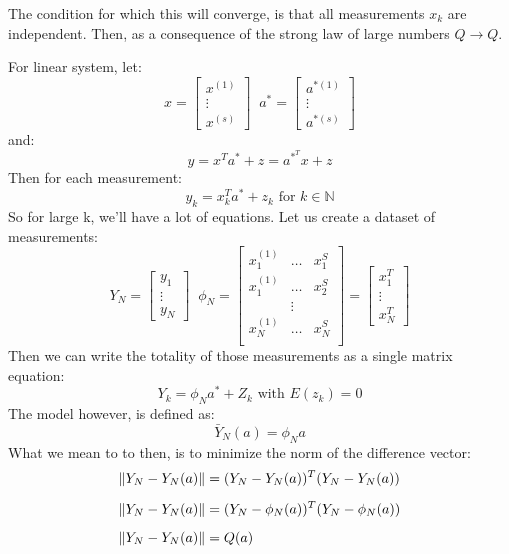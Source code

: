 {{ The condition for which this will converge, is that all measurements $x_k$ are independent. Then, as a consequence of the strong law of large numbers  $\hat{Q} \rightarrow  Q$.


}
For linear system, let:
\begin{equation}
    x = \begin{bmatrix}
        x^{(1)}  \\
        \vdots\\
        x^{(s)}
    \end{bmatrix}
    \;\;
a^{*} = \begin{bmatrix}
        a^{*(1)}  \\
        \vdots\\
        a^{*(s)}
    \end{bmatrix}
\end{equation}
and:
\begin{equation}
    y = x^{T}a^{*} + z = a^{*^{T}}x + z
\end{equation}
Then for each measurement:
\begin{equation}
    y_k = x^{T}_ka^{*} + z_k \text{ for }k\in \mathbb{N}
\end{equation}
So for large k, we'll have a lot of equations. Let us create a dataset of measurements:
\begin{equation}
    Y_N = \begin{bmatrix}
        y_1  \\
        \vdots\\
        y_N
    \end{bmatrix}
    \;\;
    \phi_N = \begin{bmatrix}
        x_1^{(1)} & \hdots & x_1^{S}  \\
        x_1^{(1)} & \hdots & x_2^{S}  \\
              & \vdots &   \\
        x_N^{(1)} & \hdots & x_N^{S}  \\
    \end{bmatrix} = 
    \begin{bmatrix}
        x_1^{T}\\
        \vdots\\
        x_N^{T}
    \end{bmatrix}
\end{equation}
Then we can write the totality of those measurements as a single matrix equation:
\begin{equation}
    Y_k = \phi_N a^{*} + Z_k \text{ with } E(z_k) = 0
\end{equation}
The model however, is defined as:
\begin{equation}
    \bar{Y}_N(a) = \phi_Na
\end{equation}
What we mean to to then, is to minimize the norm of the difference vector:
\begin{equation}
    \begin{aligned}
        \norm{Y_N - Y_N(a)} &= (Y_N - Y_N(a))^{T}(Y_N-Y_N(a))\\[1.25ex]
        \norm{Y_N - Y_N(a)} &= (Y_N - \phi_N(a))^{T}(Y_N-\phi_N(a))\\[1.25ex]
        \norm{Y_N - Y_N(a)} &=Q(a)\\[1.25ex]
        

\end{aligned}
\end{equation}}
